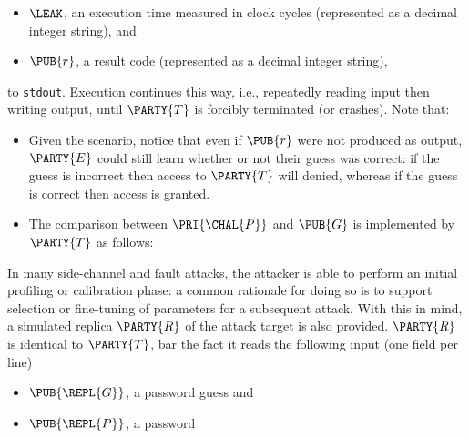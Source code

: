 \begin{itemize}
\item $\LEAK$,
      an execution time measured in clock cycles
          (represented as a                       decimal integer string),
      and
\item $\PUB{r}$,
      a  result code
          (represented as a                       decimal integer string),
\end{itemize}

\noindent
to   \lstinline[language={bash}]{stdout}.
Execution continues this way, i.e., repeatedly reading input then writing 
output, until $\PARTY{T}$ is forcibly terminated (or crashes).
Note that:

\begin{itemize}
\item Given the scenario, notice that even if $\PUB{r}$ were not produced 
      as output, $\PARTY{E}$ could still learn whether or not their guess 
      was correct: if the guess is incorrect then access to $\PARTY{T}$ 
      will denied, whereas if the guess is correct then access is granted.
\item The comparison between $\PRI{\CHAL{P}}$ and $\PUB{G}$ is implemented 
      by $\PARTY{T}$ as follows:

      \begin{algorithm}[H]
       {
        \;
      }
       {
         {
          \; 
        }
      }
      \; 
      \end{algorithm}
\end{itemize}


In many side-channel and fault attacks, the attacker is able to perform an 
initial profiling or calibration phase: a common rationale for doing so is 
to support selection or fine-tuning of parameters for a subsequent attack.  
With this in mind, a simulated replica $\PARTY{R}$ of the attack target is 
also provided.
$\PARTY{R}$ is identical to $\PARTY{T}$, bar the fact it
 reads the following  input (one field per line)

\begin{itemize}
\item $\PUB{\REPL{G}}$,
      a  password guess
      and
\item $\PUB{\REPL{P}}$,
      a  password
\end{itemize}

